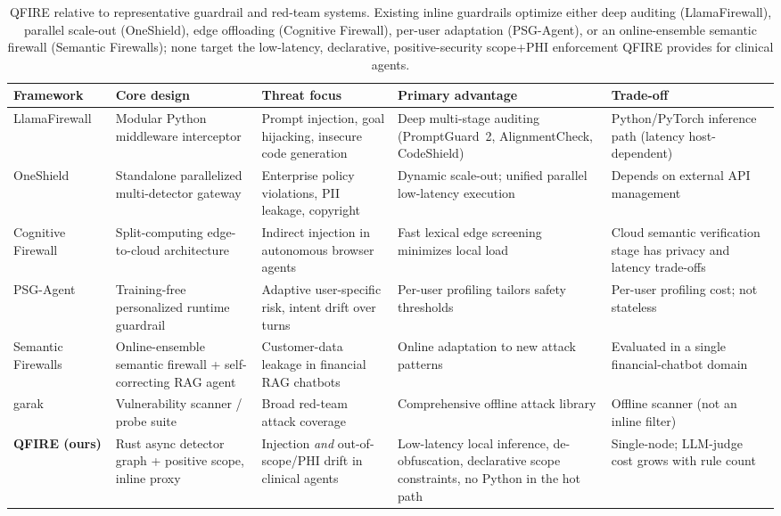 \documentclass[11pt]{article}
\begin{document}
\begin{table}[p]
\centering\small
\setlength{\tabcolsep}{5pt}
\renewcommand{\arraystretch}{1.95}
\begin{tabular}{L{2.7cm}L{3.1cm}L{3.0cm}L{3.15cm}L{2.75cm}}
\toprule
Framework & Core design & Threat focus & Primary advantage & Trade-off \\
\midrule
LlamaFirewall~\cite{llamafirewall2025} & Modular Python middleware interceptor &
Prompt injection, goal hijacking, insecure code generation & Deep multi-stage
auditing (PromptGuard~2, AlignmentCheck, CodeShield) & Python/PyTorch inference path (latency host-dependent) \\
OneShield~\cite{oneshield2025} & Standalone parallelized multi-detector gateway &
Enterprise policy violations, PII leakage, copyright & Dynamic scale-out; unified
parallel low-latency execution & Depends on external API management \\
Cognitive Firewall~\cite{cognitivefirewall2026} & Split-computing edge-to-cloud
architecture & Indirect injection in autonomous browser agents & Fast lexical
edge screening minimizes local load & Cloud semantic verification stage has privacy and latency trade-offs \\
PSG-Agent~\cite{psgagent2025} & Training-free personalized runtime guardrail &
Adaptive user-specific risk, intent drift over turns & Per-user profiling tailors
safety thresholds & Per-user profiling cost; not stateless \\
Semantic Firewalls~\cite{semanticfirewall2026} & Online-ensemble semantic firewall
+ self-correcting RAG agent & Customer-data leakage in financial RAG chatbots &
Online adaptation to new attack patterns & Evaluated in a single financial-chatbot domain \\
garak~\cite{garak2024} & Vulnerability scanner / probe suite & Broad red-team
attack coverage & Comprehensive offline attack library & Offline scanner (not an inline filter) \\
\textbf{QFIRE (ours)} & Rust async detector graph + positive scope, inline proxy &
Injection \emph{and} out-of-scope/PHI drift in clinical agents & Low-latency local
inference, de-obfuscation, declarative scope constraints, no Python in the hot
path & Single-node; LLM-judge cost grows with rule count \\
\bottomrule
\end{tabular}
\caption{QFIRE relative to representative guardrail and red-team systems. Existing
inline guardrails optimize either deep auditing (LlamaFirewall), parallel
scale-out (OneShield), edge offloading (Cognitive Firewall), per-user adaptation
(PSG-Agent), or an online-ensemble semantic firewall (Semantic Firewalls); none target
the low-latency, declarative, positive-security scope+PHI enforcement QFIRE
provides for clinical agents.}
\label{tab:related}
\end{table}
\end{document}
